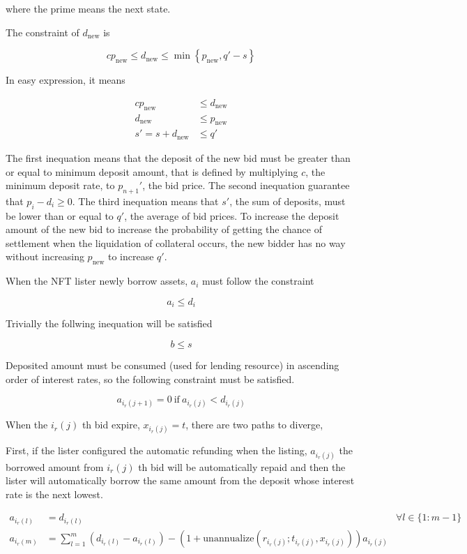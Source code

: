 \documentclass[dvipdfmx]{jsarticle}
\begin{document}
where the prime means the next state.

The constraint of $d_{\text{new}}$ is

$$
  c p_{\text{new}} \le d_{\text{new}} \le \min \left\{ p_{\text{new}}, q' - s \right\} 
$$

In easy expression, it means

$$
\begin{aligned}
  c p_{\text{new}} &\le d_{\text{new}} \\
  d_{\text{new}} &\le p_{\text{new}} \\
  s' = s + d_{\text{new}} &\le q'
\end{aligned}
$$

The first inequation means that
the deposit of the new bid must be greater than or equal to minimum deposit amount,
that is defined by multiplying $c$, the minimum deposit rate, to $p_{n+1}'$, the bid price.
The second inequation guarantee that $p_i - d_i \ge 0$.
The third inequation means that $s'$, the sum of deposits, must be lower than or equal to $q'$, the average of bid prices.
To increase the deposit amount of the new bid
to increase the probability of getting the chance of settlement when the liquidation of collateral occurs,
the new bidder has no way without increasing $p_{\text{new}}$ to increase $q'$.

When the NFT lister newly borrow assets, $a_i$ must follow the constraint

$$
  a_i \le d_i
$$

Trivially the follwing inequation will be satisfied

$$
  b \le s
$$

Deposited amount must be consumed (used for lending resource) in ascending order of interest rates,
so the following constraint must be satisfied.

$$
  a_{i_r(j+1)} = 0 \ \text{if} \ a_{i_r(j)} < d_{i_r(j)}
$$

When the $i_r(j)$ th bid expire, $x_{i_r(j)} = t$, there are two paths to diverge,

First, if the lister configured the automatic refunding when the listing, $a_{i_r(j)}$ the borrowed amount from $i_r(j)$ th bid will be automatically repaid and then
the lister will automatically borrow the same amount from the deposit whose interest rate is the next lowest.

$$
\begin{aligned}
  a_{i_r(l)} &= d_{i_r(l)} & \forall l \in \{1 : m-1\} \\
  a_{i_r(m)} &= \sum_{l=1}^m \left( d_{i_r(l)} - a_{i_r(l)} \right) - (1 + \text{unannualize}(r_{i_r(j)}; t_{i_r(j)}, x_{i_r(j)})) a_{i_r(j)} &
\end{aligned}
$$
\end{document}
